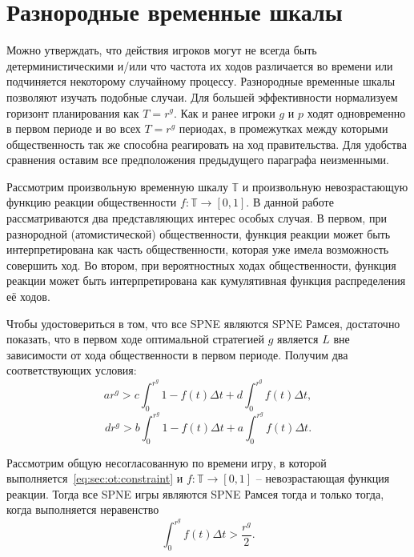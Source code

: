 \section{Разнородные временные шкалы}
\label{sec:hetero}

Можно утверждать, что действия игроков могут не всегда быть детерминистическими и/или что частота их ходов различается во времени или подчиняется некоторому случайному процессу. Разнородные временные шкалы позволяют изучать подобные случаи. Для большей эффективности нормализуем горизонт планирования как $T = r^g$. Как и ранее игроки $g$ и $p$ ходят одновременно в первом периоде и во всех $T = r^g$ периодах, в промежутках между которыми общественность так же способна реагировать на ход правительства. Для удобства сравнения оставим все предположения предыдущего параграфа неизменными.

Рассмотрим произвольную временную шкалу $\mathbb{T}$ и произвольную невозрастающую функцию реакции общественности $f : \mathbb{T} \to [0,1]$. В данной работе рассматриваются два представляющих интерес особых случая. В первом, при разнородной (атомистической) общественности, функция реакции может быть интерпретирована как часть общественности, которая уже имела возможность совершить ход. Во втором, при вероятностных ходах общественности, функция реакции может быть интерпретирована как кумулятивная функция распределения её ходов.

Чтобы удостовериться в том, что все SPNE являются SPNE Рамсея, достаточно показать, что в первом ходе оптимальной стратегией $g$ является $L$ вне зависимости от хода общественности в первом периоде. Получим два соответствующих условия:
\begin{equation}
\label{sec:hetero:main1}
ar^g > c \int_0^{r^g} 1 - f(t) \Delta t + d  \int_0^{r^g} f(t) \Delta t ,
\end{equation}
\begin{equation}
\label{sec:hetero:main2}
dr^g > b \int_0^{r^g} 1 - f(t) \Delta t + a  \int_0^{r^g} f(t) \Delta t .
\end{equation}

\begin{theorem}
\label{spneTh}
  Рассмотрим общую несогласованную по времени игру, в которой выполняется~\eqref{eq:sec:ot:constraint} и $f : \mathbb{T} \to [0,1]$ -- невозрастающая функция реакции. Тогда все SPNE игры являются SPNE Рамсея тогда и только тогда, когда выполняется неравенство
\begin{equation}
\label{sec:hetero:main3}
\int_0^{r^g} f(t) \Delta t > \frac{r^g}{2} .
\end{equation}
\end{theorem}


